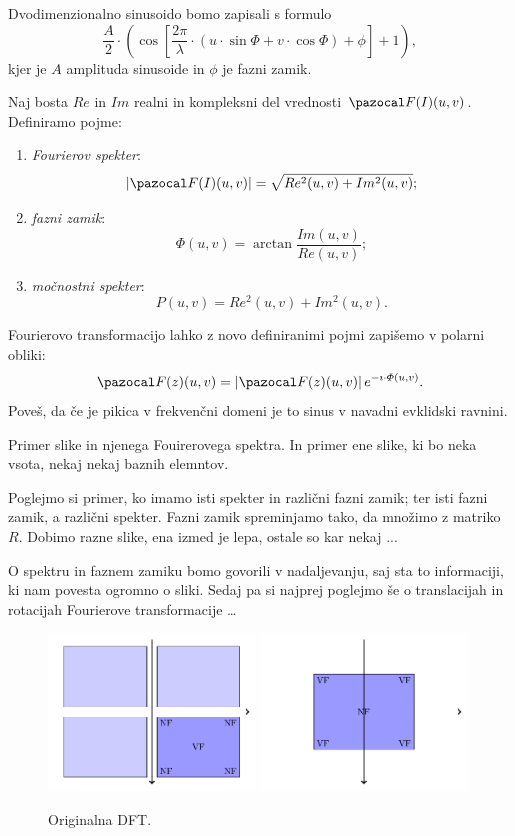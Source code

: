 Dvodimenzionalno sinusoido bomo zapisali s formulo
$$\frac{A}{2} \cdot \left(\cos\left[\frac{2\pi}{\lambda} \cdot (u \cdot \sin \Phi + v \cdot \cos \Phi) + \phi\right] + 1\right),$$
kjer je $A$ amplituda sinusoide in $\phi$ je fazni zamik.
%
\begin{definicija}
Naj bosta $Re$ in $Im$ realni in kompleksni del vrednosti $\F(I)(u, v)$. Definiramo pojme: 
%
\begin{enumerate}
\item \emph{Fourierov spekter}:
$$\abs{\F(I)(u, v)} = \sqrt{Re^2(u, v) + Im^2(u, v)};$$
\item \emph{fazni zamik}:
$$\varPhi(u, v) = \arctan\frac{Im(u, v)}{Re(u, v)};$$
\item \emph{močnostni spekter}:
$$P(u, v) = Re^2(u, v) + Im^2(u, v).$$
\end{enumerate}
\end{definicija}
%
Fourierovo transformacijo lahko z novo definiranimi pojmi zapišemo v polarni obliki:
$$\F(z)(u, v) = \abs{\F(z)(u, v)} e^{-\imath \cdot \varPhi(u, v)}.$$
%
Poveš, da če je pikica v frekvenčni domeni je to sinus v navadni evklidski ravnini.
%
\begin{primer}
Primer slike in njenega Fouirerovega spektra. In primer ene slike, ki bo neka vsota, nekaj nekaj baznih elemntov.
\end{primer}
%
\begin{primer}
Poglejmo si primer, ko imamo isti spekter in različni fazni zamik; ter isti fazni zamik, a različni spekter. Fazni zamik spreminjamo tako, da množimo z matriko $R$. Dobimo razne slike, ena izmed je lepa, ostale so kar nekaj ...		
\end{primer}
%
O spektru in faznem zamiku bomo govorili v nadaljevanju, saj sta to informaciji, ki nam povesta ogromno o sliki. Sedaj pa si najprej poglejmo še o translacijah in rotacijah Fourierove transformacije \ldots

%
\begin{figure}[htbp]
  \centering
  \includegraphics[width=0.49\textwidth]{./slike-latex/DFToriginal}
  \includegraphics[width=0.49\textwidth]{./slike-latex/DFTpremaknjena}
  \caption{Originalna DFT.}
  \label{fig:DFToriginal}
\end{figure}
%
